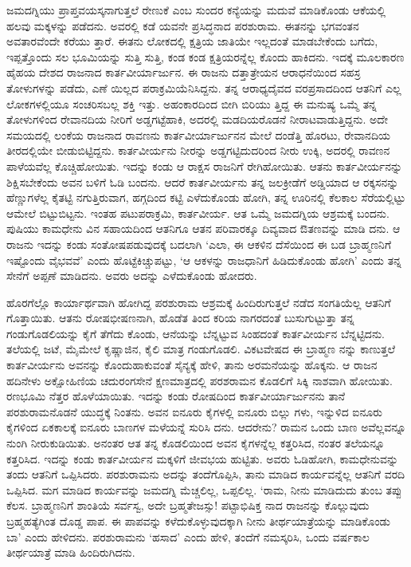 ಜಮದಗ್ನಿಯು ಪ್ರಾಪ್ತವಯಸ್ಕನಾಗುತ್ತಲೆ ರೇಣುಕೆ ಎಂಬ ಸುಂದರ ಕನ್ಯೆಯನ್ನು ಮದುವೆ ಮಾಡಿಕೊಂಡು ಆಕೆಯಲ್ಲಿ ಹಲವು ಮಕ್ಕಳನ್ನು ಪಡೆದನು. ಅವರಲ್ಲಿ ಕಡೆ ಯವನೇ ಪ್ರಸಿದ್ಧನಾದ ಪರಶುರಾಮ. ಈತನನ್ನು ಭಗವಂತನ ಅವತಾರವೆಂದೇ ಕರೆಯು ತ್ತಾರೆ. ಈತನು ಲೋಕದಲ್ಲಿ ಕ್ಷತ್ರಿಯ ಜಾತಿಯೇ ಇಲ್ಲದಂತೆ ಮಾಡಬೇಕೆಂದು ಬಗೆದು, ಇಪ್ಪತ್ತೊಂದು ಸಲ ಭೂಮಿಯನ್ನು ಸುತ್ತಿ ಸುತ್ತಿ, ಕಂಡ ಕಂಡ ಕ್ಷತ್ರಿಯರನ್ನೆಲ್ಲ ಕೊಂದು ಹಾಕಿದನು. ಇದಕ್ಕೆ ಮೂಲಕಾರಣ ಹೈಹಯ ದೇಶದ ರಾಜನಾದ ಕಾರ್ತವೀರ್ಯಾರ್ಜುನ. ಈ ರಾಜನು ದತ್ತಾತ್ರೇಯನ ಆರಾಧನೆಯಿಂದ ಸಹಸ್ರ ತೋಳುಗಳನ್ನು ಪಡೆದು, ಎಣೆ ಯಿಲ್ಲದ ಪರಾಕ್ರಮಿಯೆನಿಸಿದ್ದನು. ತನ್ನ ಆರಾಧ್ಯದೈವದ ವರಪ್ರಸಾದದಿಂದ ಆತನಿಗೆ ಎಲ್ಲ ಲೋಕಗಳಲ್ಲಿಯೂ ಸಂಚರಿಸಬಲ್ಲ ಶಕ್ತಿ ಇತ್ತು. ಅಹಂಕಾರದಿಂದ ಬೀಗಿ ಬಿರಿಯು ತ್ತಿದ್ದ ಈ ಮನುಷ್ಯ ಒಮ್ಮೆ ತನ್ನ ತೋಳುಗಳಿಂದ ರೇವಾನದಿಯ ನೀರಿಗೆ ಅಡ್ಡಗಟ್ಟೆಹಾಕಿ, ಅದರಲ್ಲಿ ಮಡದಿಯರೊಡನೆ ನೀರಾಟವಾಡುತ್ತಿದ್ದನು. ಅದೇ ಸಮಯದಲ್ಲಿ ಲಂಕೆಯ ರಾಜನಾದ ರಾವಣನು ಕಾರ್ತವೀರ್ಯಾರ್ಜುನನ ಮೇಲೆ ದಂಡೆತ್ತಿ ಹೊರಟು, ರೇವಾನದಿಯ ತೀರದಲ್ಲಿಯೇ ಬೀಡುಬಿಟ್ಟಿದ್ದನು. ಕಾರ್ತವೀರ್ಯನು ನೀರನ್ನು ಅಡ್ಡಗಟ್ಟಿದುದರಿಂದ ನೀರು ಉಕ್ಕಿ, ಅದರಲ್ಲಿ ರಾವಣನ ಪಾಳೆಯವೆಲ್ಲ ಕೊಚ್ಚಿಹೋಯಿತು. ಇದನ್ನು ಕಂಡು ಆ ರಾಕ್ಷಸ ರಾಜನಿಗೆ ರೇಗಿಹೋಯಿತು. ಆತನು ಕಾರ್ತವೀರ್ಯನನ್ನು ಶಿಕ್ಷಿಸಬೇಕೆಂದು ಅವನ ಬಳಿಗೆ ಓಡಿ ಬಂದನು. ಆದರೆ ಕಾರ್ತವೀರ್ಯನು ತನ್ನ ಜಲಕ್ರೀಡೆಗೆ ಅಡ್ಡಿಯಾದ ಆ ರಕ್ಕಸನನ್ನು ಹೆಣ್ಣುಗಳೆಲ್ಲ ಕೈತಟ್ಟಿ ನಗುತ್ತಿರುವಾಗ, ಹಗ್ಗದಿಂದ ಕಟ್ಟಿ ಎಳೆದುಕೊಂಡು ಹೋಗಿ, ತನ್ನ ಊರಿನಲ್ಲಿ ಕೆಲಕಾಲ ಸೆರೆಯಲ್ಲಿಟ್ಟು ಆಮೇಲೆ ಬಿಟ್ಟುಬಿಟ್ಟನು. ಇಂತಹ ಪಟುಪರಾಕ್ರಮಿ, ಕಾರ್ತವೀರ್ಯ. ಆತ ಒಮ್ಮೆ ಜಮದಗ್ನಿಯ ಆಶ್ರಮಕ್ಕೆ ಬಂದನು. ಪುಷಿಯು ಕಾಮಧೇನು ವಿನ ಸಹಾಯದಿಂದ ಆತನಿಗೂ ಆತನ ಪರಿವಾರಕ್ಕೂ ದಿವ್ಯವಾದ ಔತಣವನ್ನು ಮಾಡಿ ದನು. ಆ ರಾಜನು ಇದನ್ನು ಕಂಡು ಸಂತೋಷಪಡುವುದಕ್ಕೆ ಬದಲಾಗಿ ‘ಎಲಾ, ಈ ಆಕಳಿನ ದೆಸೆಯಿಂದ ಈ ಬಡ ಬ್ರಾಹ್ಮಣನಿಗೆ ಇಷ್ಟೊಂದು ವೈಭವವೆ’ ಎಂದು ಹೊಟ್ಟೆಕಿಚ್ಚುಪಟ್ಟು, ‘ಆ ಆಕಳನ್ನು ರಾಜಧಾನಿಗೆ ಹಿಡಿದುಕೊಂಡು ಹೋಗಿ’ ಎಂದು ತನ್ನ ಸೇನೆಗೆ ಅಪ್ಪಣೆ ಮಾಡಿದನು. ಅವರು ಅದನ್ನು ಎಳೆದುಕೊಂಡು ಹೋದರು.

ಹೊರಗೆಲ್ಲೊ ಕಾರ್ಯಾರ್ಥವಾಗಿ ಹೋಗಿದ್ದ ಪರಶುರಾಮ ಆಶ್ರಮಕ್ಕೆ ಹಿಂದಿರುಗುತ್ತಲೆ ನಡೆದ ಸಂಗತಿಯೆಲ್ಲ ಆತನಿಗೆ ಗೊತ್ತಾಯಿತು. ಆತನು ರೋಷಭೀಷಣನಾಗಿ, ಹೊಡೆತ ತಿಂದ ಕರಿಯ ನಾಗರದಂತೆ ಬುಸುಗುಟ್ಟುತ್ತಾ ತನ್ನ ಗಂಡುಗೊಡಲಿಯನ್ನು ಕೈಗೆ ತೆಗೆದು ಕೊಂಡು, ಆನೆಯನ್ನು ಬೆನ್ನಟ್ಟುವ ಸಿಂಹದಂತೆ ಕಾರ್ತವೀರ್ಯನ ಬೆನ್ನಟ್ಟಿದನು. ತಲೆಯಲ್ಲಿ ಜಟೆ, ಮೈಮೇಲೆ ಕೃಷ್ಣಾಜಿನ, ಕೈಲಿ ಮಾತ್ರ ಗಂಡುಗೊಡಲಿ. ವಿಕಟವೇಷದ ಈ ಬ್ರಾಹ್ಮಣ ನನ್ನು ಕಾಣುತ್ತಲೆ ಕಾರ್ತವೀರ್ಯನು ಅವನನ್ನು ಕೊಂದುಹಾಕುವಂತೆ ಸೈನ್ಯಕ್ಕೆ ಹೇಳಿ, ತಾನು ಅರಮನೆಯನ್ನು ಹೊಕ್ಕನು. ಆ ರಾಜನ ಹದಿನೇಳು ಅಕ್ಷೋಹಿಣಿಯ ಚದುರಂಗಸೇನೆ ಕ್ಷಣಮಾತ್ರದಲ್ಲಿ ಪರಶರಾಮನ ಕೊಡಲಿಗೆ ಸಿಕ್ಕಿ ನಾಶವಾಗಿ ಹೋಯಿತು. ರಣಭೂಮಿ ನೆತ್ತರ ಹೊಳೆಯಾಯಿತು. ಇದನ್ನು ಕಂಡು ರೋಷದಿಂದ ಕಾರ್ತವೀರ್ಯಾರ್ಜುನನು ತಾನೆ ಪರಶುರಾಮನೊಡನೆ ಯುದ್ಧಕ್ಕೆ ನಿಂತನು. ಅವನ ಐನೂರು ಕೈಗಳಲ್ಲಿ ಐನೂರು ಬಿಲ್ಲು ಗಳು, ಇನ್ನುಳಿದ ಐನೂರು ಕೈಗಳಿಂದ ಏಕಕಾಲಕ್ಕೆ ಐನೂರು ಬಾಣಗಳ ಮಳೆಯನ್ನೆ ಸುರಿಸಿ ದನು. ಆದರೇನು? ರಾಮನ ಒಂದು ಬಾಣ ಅವೆಲ್ಲವನ್ನೂ ನುಂಗಿ ನೀರುಕುಡಿಯಿತು. ಅನಂತರ ಆತ ತನ್ನ ಕೊಡಲಿಯಿಂದ ಅವನ ಕೈಗಳನ್ನೆಲ್ಲ ಕತ್ತರಿಸಿದ, ನಂತರ ತಲೆಯನ್ನೂ ಕತ್ತರಿಸಿದ. ಇದನ್ನು ಕಂಡು ಕಾರ್ತವೀರ್ಯನ ಮಕ್ಕಳಿಗೆ ಜೀವಭಯ ಹುಟ್ಟಿತು. ಅವರು ಓಡಿಹೋಗಿ, ಕಾಮಧೇನುವನ್ನು ತಂದು ಆತನಿಗೆ ಒಪ್ಪಿಸಿದರು. ಪರಶುರಾಮನು ಅದನ್ನು ತಂದೆಗೊಪ್ಪಿಸಿ, ತಾನು ಮಾಡಿದ ಕಾರ್ಯವನ್ನೆಲ್ಲ ಆತನಿಗೆ ವರದಿ ಒಪ್ಪಿಸಿದ. ಮಗ ಮಾಡಿದ ಕಾರ್ಯವನ್ನು ಜಮದಗ್ನಿ ಮೆಚ್ಚಲಿಲ್ಲ, ಒಪ್ಪಲಿಲ್ಲ. ‘ರಾಮ, ನೀನು ಮಾಡಿದುದು ತುಂಬ ತಪ್ಪು ಕೆಲಸ. ಬ್ರಾಹ್ಮಣನಿಗೆ ಶಾಂತಿಯೆ ಸರ್ವಸ್ವ, ಅದೇ ಬ್ರಹ್ಮತೇಜಸ್ಸು! ಪಟ್ಟಾಭಿಷಿಕ್ತ ನಾದ ರಾಜನನ್ನು ಕೊಲ್ಲುವುದು ಬ್ರಹ್ಮಹತ್ಯೆಗಿಂತ ದೊಡ್ಡ ಪಾಪ. ಈ ಪಾಪವನ್ನು ಕಳೆದುಕೊಳ್ಳುವುದಕ್ಕಾಗಿ ನೀನು ತೀರ್ಥಯಾತ್ರೆಯನ್ನು ಮಾಡಿಕೊಂಡು ಬಾ’ ಎಂದು ಹೇಳಿದನು. ಪರಶುರಾಮನು ‘ಹಸಾದ’ ಎಂದು ಹೇಳಿ, ತಂದೆಗೆ ನಮಸ್ಕರಿಸಿ, ಒಂದು ವರ್ಷಕಾಲ ತೀರ್ಥಯಾತ್ರೆ ಮಾಡಿ ಹಿಂದಿರುಗಿದನು.

